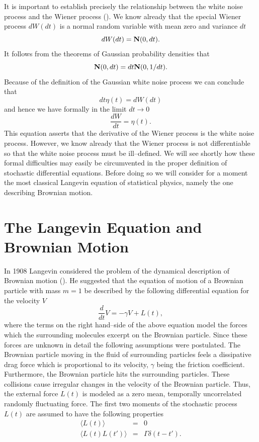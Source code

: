 It is important to establish precisely the relationship
between the white noise process and the Wiener process
(\cite{GILLESPIE}).
We know already that the special Wiener process $dW(dt)$
is a normal random variable with mean zero and variance $dt$
\begin{equation*}
dW(dt) = {\bf N}(0,dt).
\end{equation*}
It follows from the theorems of Gaussian probability densities
that
\begin{equation*}
{\bf N}(0,dt) =  dt {\bf N}(0,1/dt).
\end{equation*}
Because of the definition of the Gaussian white noise process we 
can conclude that
\begin{equation*}
dt \eta(t) = dW(dt)
\end{equation*}
and hence we have formally in the limit $dt \rightarrow 0$
\begin{equation*}
\frac{dW}{dt} = \eta(t).
\end{equation*}
This equation asserts that the derivative of the Wiener process is 
the white noise process. However, we know already that the Wiener
process is not differentiable so that the white noise process must 
be ill--defined. We will see shortly how these formal difficulties 
may easily be circumvented in the proper definition
of stochastic differential equations. Before doing so we will 
consider for a 
moment the most classical Langevin equation of statistical 
physics, namely the one describing Brownian motion.

\section{The Langevin Equation and Brownian Motion}
In 1908 Langevin considered the problem of the dynamical 
description of Brownian motion (\cite{VAN_KAMPEN}). 
He suggested that the equation of 
motion of a Brownian particle with mass $m=1$ be described by the
following differential equation for the velocity $V$
\begin{equation}
\label{LANGEVIN}
\frac{d}{dt} V = -\gamma V + L(t),
\end{equation}
where the terms on the right hand--side of the above equation 
model the forces which the surrounding molecules excerpt on the 
Brownian particle. Since these forces are unknown in detail the 
following assumptions were postulated. The Brownian particle 
moving in the fluid of surrounding particles feels
a dissipative drag force which is proportional to its velocity, $\gamma$  being 
the friction coefficient. Furthermore, the Brownian particle hits
the surrounding particles. These collisions cause irregular 
changes in the velocity of the Brownian particle. Thus, the external force
$L(t)$ is modeled as a zero mean, temporally uncorrelated
randomly fluctuating force. The first two moments of the
stochastic process $L(t)$ are assumed to 
have the following properties
\begin{eqnarray*}
\langle L(t) \rangle &=& 0 \\
\langle L(t) L(t') \rangle &=& \Gamma \delta(t-t').
\end{eqnarray*}

